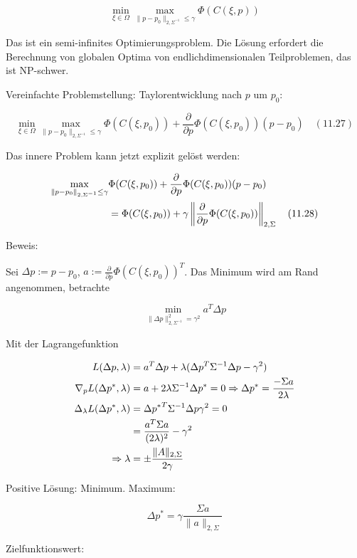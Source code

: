 \[ \min_{\xi \in \Omega} \max_{\|p-p_0\|_{2,\Sigma^{-1}} \leq \gamma} \Phi(C(\xi,p)) \]

Das ist ein semi-infinites Optimierungsproblem. Die Lösung erfordert die Berechnung von globalen Optima von endlichdimensionalen Teilproblemen, das ist NP-schwer.

Vereinfachte Problemstellung: Taylorentwicklung nach $p$ um $p_0$:

\[ \min_{\xi \in\Omega} \max_{\|p-p_0\|_{2,\Sigma^{-1}} \leq \gamma} \Phi(C(\xi,p_0)) + \frac{\partial}{\partial p} \Phi(C(\xi,p_0))(p-p_0) \quad (11.27) \]

Das innere Problem kann jetzt explizit gelöst werden:


\begin{align*}
\max_{\|p-p_0\|_{2,\Sigma^{-1}} \leq \gamma} &\Phi(C(\xi, p_0)) + \frac{\partial }{\partial p} \Phi(C(\xi,p_0)) (p-p_0) \\
&= \Phi(C(\xi,p_0)) + \gamma \left\| \frac{\partial}{\partial p} \Phi(C(\xi,p_0)) \right\|_{2,\Sigma} \quad (11.28) \\
\end{align*}

Beweis:

Sei $\Delta p := p-p_0$, $a := \frac{\partial}{\partial p} \Phi(C(\xi,p_0))^T$. Das Minimum wird am Rand angenommen, betrachte

\[ \min_{\|\Delta p\|_{2,\Sigma^{-1}}^2 = \gamma^2} a^T \Delta p \]

Mit der Lagrangefunktion 

\begin{align*}
L(\Delta p, \lambda) &= a^T \Delta p + \lambda(\Delta p^T \Sigma^{-1} \Delta p - \gamma^2) \\
\nabla_p L(\Delta p^*, \lambda) &= a + 2 \lambda \Sigma^{-1} \Delta p^* = 0 \Rightarrow \Delta p^* = \frac{-\Sigma a}{2\lambda} \\
\Delta_\lambda L(\Delta p^*, \lambda) &= \Delta {p^*}^T \Sigma^{-1} \Delta p \gamma^2 = 0 \\
&= \frac{a^T \Sigma a}{(2\lambda)^2} - \gamma^2 \\
\Rightarrow \lambda &= \pm \frac{\|A\|_{2,\Sigma}}{2\gamma}
\end{align*}

Positive Lösung: Minimum. Maximum:

\[ \Delta p^* = \gamma \frac{\Sigma a}{\|a\|_{2,\Sigma}} \]

Zielfunktionswert:

